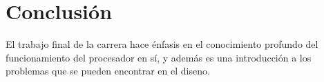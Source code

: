 \section{Conclusi\'on}
El trabajo final de la carrera hace \'enfasis en el conocimiento profundo del funcionamiento del procesador en s\'i, y adem\'as es una introducci\'on a los problemas que se pueden encontrar en el diseno. 